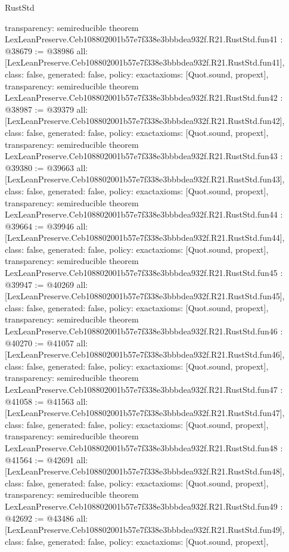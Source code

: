 \begin{lexlean}{RustStd}
\begin{coremodule}
{  transparency: semireducible
}
theorem LexLeanPreserve.Ceb108802001b57e7f338e3bbbdea932f.R21.RustStd.fun41 : @38679 := @38986 {
  all: [LexLeanPreserve.Ceb108802001b57e7f338e3bbbdea932f.R21.RustStd.fun41],
  class: false,
  generated: false,
  policy: exact{axioms: [Quot.sound, propext]},
  transparency: semireducible
}
theorem LexLeanPreserve.Ceb108802001b57e7f338e3bbbdea932f.R21.RustStd.fun42 : @38987 := @39379 {
  all: [LexLeanPreserve.Ceb108802001b57e7f338e3bbbdea932f.R21.RustStd.fun42],
  class: false,
  generated: false,
  policy: exact{axioms: [Quot.sound, propext]},
  transparency: semireducible
}
theorem LexLeanPreserve.Ceb108802001b57e7f338e3bbbdea932f.R21.RustStd.fun43 : @39380 := @39663 {
  all: [LexLeanPreserve.Ceb108802001b57e7f338e3bbbdea932f.R21.RustStd.fun43],
  class: false,
  generated: false,
  policy: exact{axioms: [Quot.sound, propext]},
  transparency: semireducible
}
theorem LexLeanPreserve.Ceb108802001b57e7f338e3bbbdea932f.R21.RustStd.fun44 : @39664 := @39946 {
  all: [LexLeanPreserve.Ceb108802001b57e7f338e3bbbdea932f.R21.RustStd.fun44],
  class: false,
  generated: false,
  policy: exact{axioms: [Quot.sound, propext]},
  transparency: semireducible
}
theorem LexLeanPreserve.Ceb108802001b57e7f338e3bbbdea932f.R21.RustStd.fun45 : @39947 := @40269 {
  all: [LexLeanPreserve.Ceb108802001b57e7f338e3bbbdea932f.R21.RustStd.fun45],
  class: false,
  generated: false,
  policy: exact{axioms: [Quot.sound, propext]},
  transparency: semireducible
}
theorem LexLeanPreserve.Ceb108802001b57e7f338e3bbbdea932f.R21.RustStd.fun46 : @40270 := @41057 {
  all: [LexLeanPreserve.Ceb108802001b57e7f338e3bbbdea932f.R21.RustStd.fun46],
  class: false,
  generated: false,
  policy: exact{axioms: [Quot.sound, propext]},
  transparency: semireducible
}
theorem LexLeanPreserve.Ceb108802001b57e7f338e3bbbdea932f.R21.RustStd.fun47 : @41058 := @41563 {
  all: [LexLeanPreserve.Ceb108802001b57e7f338e3bbbdea932f.R21.RustStd.fun47],
  class: false,
  generated: false,
  policy: exact{axioms: [Quot.sound, propext]},
  transparency: semireducible
}
theorem LexLeanPreserve.Ceb108802001b57e7f338e3bbbdea932f.R21.RustStd.fun48 : @41564 := @42691 {
  all: [LexLeanPreserve.Ceb108802001b57e7f338e3bbbdea932f.R21.RustStd.fun48],
  class: false,
  generated: false,
  policy: exact{axioms: [Quot.sound, propext]},
  transparency: semireducible
}
theorem LexLeanPreserve.Ceb108802001b57e7f338e3bbbdea932f.R21.RustStd.fun49 : @42692 := @43486 {
  all: [LexLeanPreserve.Ceb108802001b57e7f338e3bbbdea932f.R21.RustStd.fun49],
  class: false,
  generated: false,
  policy: exact{axioms: [Quot.sound, propext]},
}
\end{coremodule}
\end{lexlean}
